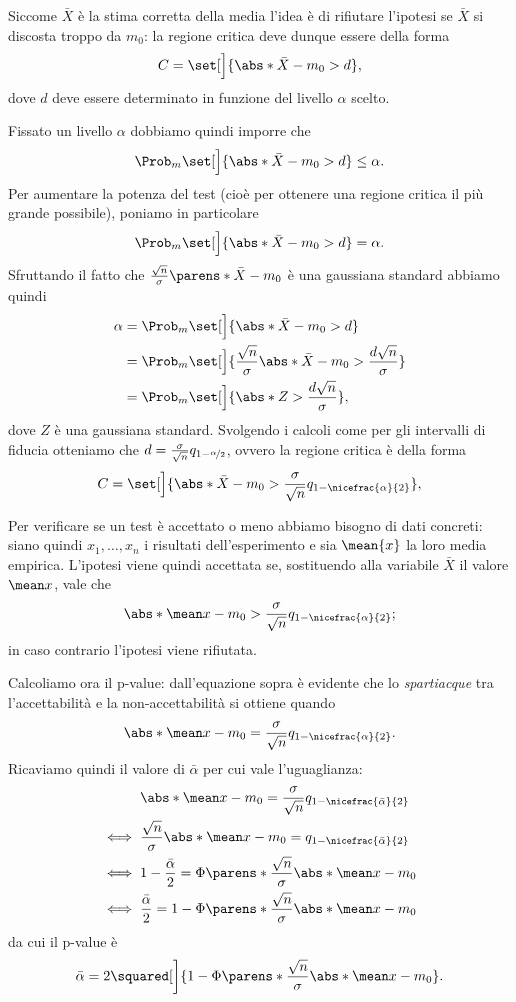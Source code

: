 Siccome $\bar X$ è la stima corretta della media l'idea è di rifiutare l'ipotesi se $\bar X$ si discosta troppo da $m_0$: la regione critica deve dunque essere della forma \[
    C = \set[\Big]{\abs*{\bar X - m_0} > d}, 
\] dove $d$ deve essere determinato in funzione del livello $\alpha$ scelto.

Fissato un livello $\alpha$ dobbiamo quindi imporre che \[
    \Prob_m\set[\Big]{\abs*{\bar X - m_0} > d} \leq \alpha.   
\] Per aumentare la potenza del test (cioè per ottenere una regione critica il più grande possibile), poniamo in particolare \[
    \Prob_m\set[\Big]{\abs*{\bar X - m_0} > d} = \alpha.   
\] Sfruttando il fatto che $\frac{\sqrt{n}}{\sigma}\parens*{\bar X - m_0}$ è una gaussiana standard abbiamo quindi \begin{align*}
    \alpha &= \Prob_m\set[\Big]{\abs*{\bar X - m_0} > d}\\ 
    &= \Prob_m\set[\Big]{\frac{\sqrt{n}}{\sigma}\abs*{\bar X - m_0} > \frac{d\sqrt{n}}{\sigma}}\\
    &= \Prob_m\set[\Big]{\abs*{Z} > \frac{d\sqrt{n}}{\sigma}},
\end{align*}
dove $Z$ è una gaussiana standard. Svolgendo i calcoli come per gli intervalli di fiducia otteniamo che $d = \frac{\sigma}{\sqrt n}q_{1 - \nicefrac{\alpha}{2}}$, ovvero la regione critica è della forma \[
    C = \set[\Big]{\abs*{\bar X - m_0} > \frac{\sigma}{\sqrt n}q_{1 - \nicefrac{\alpha}{2}}},     
\]

Per verificare se un test è accettato o meno abbiamo bisogno di dati concreti: siano quindi $x_1, \dots, x_n$ i risultati dell'esperimento e sia $\mean{x}$ la loro media empirica. L'ipotesi viene quindi accettata se, sostituendo alla variabile $\bar X$ il valore $\mean x$, vale che \[
    \abs*{\mean x - m_0} > \frac{\sigma}{\sqrt n}q_{1 - \nicefrac{\alpha}{2}};
\] in caso contrario l'ipotesi viene rifiutata.

Calcoliamo ora il p-value: dall'equazione sopra è evidente che lo \emph{spartiacque} tra l'accettabilità e la non-accettabilità si ottiene quando \[
    \abs*{\mean x - m_0} = \frac{\sigma}{\sqrt n}q_{1 - \nicefrac{\alpha}{2}}.    
\] Ricaviamo quindi il valore di $\bar\alpha$ per cui vale l'uguaglianza:
\begin{align*}
    &\abs*{\mean x - m_0} = \frac{\sigma}{\sqrt n}q_{1 - \nicefrac{\bar\alpha}{2}} \\
    \iff {}& \frac{\sqrt n}{\sigma}\abs*{\mean x - m_0} = q_{1 - \nicefrac{\bar\alpha}{2}}\\
    \iff {}& 1 - \frac{\bar\alpha}{2} = \Phi\parens*{\frac{\sqrt n}{\sigma}\abs*{\mean x - m_0}}\\
    \iff {}& \frac{\bar\alpha}{2} = 1 - \Phi\parens*{\frac{\sqrt n}{\sigma}\abs*{\mean x - m_0}}
\end{align*}
da cui il p-value è \[
    \bar\alpha = 2\squared[\bigg]{1 - \Phi\parens*{\frac{\sqrt n}{\sigma}\abs*{\mean x - m_0}}}.    
\]